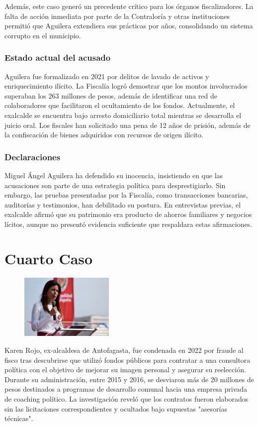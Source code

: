 \documentclass[letter,12pt]{article}
\begin{document}
	Además, este caso generó un precedente crítico para los órganos fiscalizadores. La falta de acción inmediata por parte de la Contraloría y otras instituciones permitió que Aguilera extendiera sus prácticas por años, consolidando un sistema corrupto en el municipio.
	
	\subsubsection{Estado actual del acusado}
	Aguilera fue formalizado en 2021 por delitos de lavado de activos y enriquecimiento ilícito. La Fiscalía logró demostrar que los montos involucrados superaban los 263 millones de pesos, además de identificar una red de colaboradores que facilitaron el ocultamiento de los fondos. Actualmente, el exalcalde se encuentra bajo arresto domiciliario total mientras se desarrolla el juicio oral. Los fiscales han solicitado una pena de 12 años de prisión, además de la confiscación de bienes adquiridos con recursos de origen ilícito.
	
	\subsubsection{Declaraciones}
	Miguel Ángel Aguilera ha defendido su inocencia, insistiendo en que las acusaciones son parte de una estrategia política para desprestigiarlo. Sin embargo, las pruebas presentadas por la Fiscalía, como transacciones bancarias, auditorías y testimonios, han debilitado su postura. En entrevistas previas, el exalcalde afirmó que su patrimonio era producto de ahorros familiares y negocios lícitos, aunque no presentó evidencia suficiente que respaldara estas afirmaciones.
	
	\section{Cuarto Caso}
	\begin{figure}
		\centering
		\includegraphics[width=0.4\textwidth]{figures/Karen}
	\end{figure}
	Karen Rojo, ex-alcaldesa de Antofagasta, fue condenada en 2022 por fraude al fisco tras descubrirse que utilizó fondos públicos para contratar a una consultora política con el objetivo de mejorar su imagen personal y asegurar su reelección. Durante su administración, entre 2015 y 2016, se desviaron más de 20 millones de pesos destinados a programas de desarrollo comunal hacia una empresa privada de coaching político. La investigación reveló que los contratos fueron elaborados sin las licitaciones correspondientes y ocultados bajo supuestas "asesorías técnicas".
	
\end{document}
